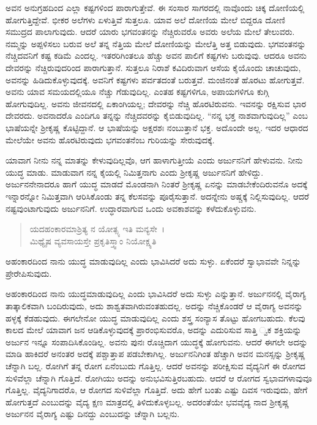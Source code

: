 ಅವನ ಅನುಗ್ರಹದಿಂದ ಎಲ್ಲಾ ಕಷ್ಟಗಳಿಂದ ಪಾರಾಗುತ್ತೇವೆ. ಈ ಸಂಸಾರ ಸಾಗರದಲ್ಲಿ ನಾವೊಂದು ಚಿಕ್ಕ ದೋಣಿಯಲ್ಲಿ ಹೋಗುತ್ತಿದ್ದೇವೆ. ಭೀಕರ ಅಲೆಗಳು ಏಳುತ್ತಿವೆ ಸುತ್ತಲೂ. ಯಾವ ಅಲೆ ದೋಣಿಯ ಮೇಲೆ ಬಿದ್ದರೂ ದೋಣಿ ಸಮುದ್ರದ ಪಾಲಾಗುವುದು. ಆದರೆ ಯಾರು ಭಗವಂತನನ್ನು ನೆಚ್ಚಿರುವರೊ ಅವರು ಅಲೆಯ ಮೇಲೆ ತೇಲುವರು. ನಮ್ಮನ್ನು ಅಪ್ಪಳಿಸಲು ಬರುವ ಅಲೆ ತನ್ನ ನೆತ್ತಿಯ ಮೇಲೆ ದೋಣಿಯನ್ನು ಮೇಲೆತ್ತಿ ಅತ್ತ ಬಿಡುವುದು. ಭಗವಂತನನ್ನು ನೆಚ್ಚಿದವನಿಗೆ ಕಷ್ಟ ಕಡಿಮೆ ಎಂದಲ್ಲ. ಇತರರಿಗಿಂತಲೂ ಹೆಚ್ಚು ಅವನ ಪಾಲಿಗೆ ಕಷ್ಟಗಳು ಬರುವುವು. ಆದರೂ ಅವನು ದೇವರನ್ನು ನೆಚ್ಚಿರುವುದರಿಂದ ಪಾರಾಗುತ್ತಾನೆ. ಸುತ್ತಲೂ ನಿರಾಶೆ ಕವಿದಿರುವಾಗ ಆಸೆಯ ಕೈಯೊಂದು ಚಾಚುವುದು, ಅವನನ್ನು ಹಿಡಿದುಕೊಳ್ಳುವುದಕ್ಕೆ. ಅವನಿಗೆ ಕಷ್ಟಗಳು ಪರ್ವತದಂತೆ ಬರುತ್ತವೆ. ಮಂಜಿನಂತೆ ಹೊರಟು ಹೋಗುತ್ತವೆ. ಅವನು ಯಾವ ಸಮಯದಲ್ಲಿಯೂ ನೆಚ್ಚು ಗೆಡುವುದಿಲ್ಲ. ಎಂತಹ ಕಷ್ಟಗಳಿಗೂ, ಅಪಾಯಗಳಿಗೂ ಕುಗ್ಗಿ ಹೋಗುವುದಿಲ್ಲ. ಅವನು ಜೀವನದಲ್ಲಿ ಏಕಾಂಗಿಯಲ್ಲ; ದೇವರನ್ನು ನೆಚ್ಚಿ ಹೊರಟಿರುವನು. ಇವನನ್ನು ರಕ್ಷಿಸುವ ಭಾರ ದೇವರದು. ಅವನಾದರೊ ಎಂದಿಗೂ ತನ್ನನ್ನು ನೆಚ್ಚಿದವರನ್ನು ಕೈಬಿಡುವುದಿಲ್ಲ. “ನನ್ನ ಭಕ್ತ ನಾಶವಾಗುವುದಿಲ್ಲ” ಎಂಬ ಭಾಷೆಯನ್ನೇ ಶ‍್ರೀಕೃಷ್ಣ ಕೊಟ್ಟಿದ್ದಾನೆ. ಆ ಭಾಷೆಯನ್ನು ಅಕ್ಷರಶಃ ನಂಬುತ್ತಾನೆ ಭಕ್ತ. ಅದೊಂದೇ ಅಲ್ಲ. ಇದರ ಆಧಾರದ ಮೇಲೆಯೇ ಅವನು ಹೊರಟಿರುವುದು ಭಗವಂತನೆಂಬ ಗುರಿಯನ್ನು ಸೇರುವುದಕ್ಕೆ.

ಯಾವಾಗ ನೀನು ನನ್ನ ಮಾತನ್ನು ಕೇಳುವುದಿಲ್ಲವೊ, ಆಗ ಹಾಳಾಗುತ್ತೀಯೆ ಎಂದು ಅರ್ಜುನನಿಗೆ ಹೇಳುವನು. ನೀನು ಯುದ್ಧ ಮಾಡು. ಮಾಡುವಾಗ ನನ್ನ ಕೈಯಲ್ಲಿ ನಿಮಿತ್ತನಾಗು ಎಂದು ಶ‍್ರೀಕೃಷ್ಣ ಅರ್ಜುನನಿಗೆ ಹೇಳಿದ್ದು. ಅರ್ಜುನನೇನಾದರೂ ಹಾಗೆ ಯುದ್ಧ ಮಾಡದೆ ಮೊಂಡನಾಗಿ ನಿಂತರೆ ಶ‍್ರೀಕೃಷ್ಣ ಏನನ್ನು ಮಾಡಬೇಕೆಂದಿರುವನೊ ಅದಕ್ಕೆ ಇನ್ನಾರನ್ನೋ ನಿಮಿತ್ತವಾಗಿ ಆರಿಸಿಕೊಂಡು ತನ್ನ ಕೆಲಸವನ್ನು ಪೂರೈಸುತ್ತಾನೆ. ಅದನ್ನೇನು ಅಷ್ಚಕ್ಕೆ ನಿಲ್ಲಿಸುವುದಿಲ್ಲ. ಆದರೆ ನಷ್ಟವುಂಟಾಗುವುದು ಅರ್ಜುನನಿಗೆ. ಉದ್ಧಾರವಾಗುವ ಒಂದು ಅವಕಾಶವನ್ನು ಕಳೆದುಕೊಳ್ಳುವನು.

\begin{verse}
ಯದಹಂಕಾರಮಾಶ್ರಿತ್ಯ ನ ಯೋತ್ಸ್ಯ ಇತಿ ಮನ್ಯಸೇ~।\\ಮಿಥ್ಯೈಷ ವ್ಯವಸಾಯಸ್ತೇ ಪ್ರಕೃತಿಸ್ತ್ವಾಂ ನಿಯೋಕ್ಷ್ಯತಿ 
\end{verse}

{\small ಅಹಂಕಾರದಿಂದ ನಾನು ಯುದ್ಧ ಮಾಡುವುದಿಲ್ಲ ಎಂದು ಭಾವಿಸಿದರೆ ಅದು ಸುಳ್ಳು. ಏಕೆಂದರೆ ಸ್ವಾಭಾವವೇ ನಿನ್ನನ್ನು ಪ್ರೇರೇಪಿಸುವುದು.}

ಅಹಂಕಾರದಿಂದ ನಾನು ಯುದ್ಧಮಾಡುವುದಿಲ್ಲ ಎಂದು ಭಾವಿಸಿದರೆ ಅದು ಸುಳ್ಳು ಎನ್ನುತ್ತಾನೆ. ಅರ್ಜುನನಲ್ಲಿ ವೈರಾಗ್ಯ ತಾತ್ಕಾಲಿಕವಾಗಿ ಬಂದಿರುವುದು, ಅದು ಶಾಶ್ವತವಾಗಿರುವಂತಹುದಲ್ಲ. ಅದನ್ನು ನೆಚ್ಚಿಕೊಂಡರೆ ಆ ವೈರಾಗ್ಯ ಅವನನ್ನು ಹಳ್ಳಕ್ಕೆ ಕೆಡಹುವುದು. ಈಗಲೇನೋ ಯುದ್ಧ ಮಾಡುವುದಿಲ್ಲ ಎಂದು ಶಸ್ತ್ರ ಸಂನ್ಯಾಸ ತೊಟ್ಟು ಹೋಗಬಹುದು. ಕೆಲವು ಕಾಲದ ಮೇಲೆ ಯಾವಾಗ ಜನ ಆಡಿಕೊಳ್ಳುವುದಕ್ಕೆ ಪ್ರಾರಂಭಿಸುವರೊ, ಅದನ್ನು ಎದುರಿಸುವ ಸಾತ್ತಿ ್ವಕ ಶಕ್ತಿಯನ್ನು ಅರ್ಜುನ ಇನ್ನೂ ಸಂಪಾದಿಸಿಕೊಂಡಿಲ್ಲ. ಅವನು ಪುನಃ ರೊಚ್ಚಿದಾಗ ಯುದ್ಧಕ್ಕೆ ಹೋಗುವನು. ಆದರೆ ಈಗಲೇ ಅದನ್ನು ಮಾಡಿ ಹಾಕಿದರೆ ಅನಂತರ ಅದಕ್ಕೆ ಪಶ್ಚಾತ್ತಾಪ ಪಡಬೇಕಾಗಿಲ್ಲ. ಅರ್ಜುನನಿಗಿಂತ ಹೆಚ್ಚಾಗಿ ಅವನ ಮನಸ್ಸನ್ನು ಶ‍್ರೀಕೃಷ್ಣ ಚೆನ್ನಾಗಿ ಬಲ್ಲ. ರೋಗಿಗೆ ತನ್ನ ರೋಗ ಏನೆಂಬುದು ಗೊತ್ತಿಲ್ಲ. ಆದರೆ ಅವನನ್ನು ಪರೀಕ್ಷಿಸುವ ವೈದ್ಯನಿಗೆ ಈ ರೋಗದ ಸುಳಿವೆಲ್ಲಾ ಚೆನ್ನಾಗಿ ಗೊತ್ತಿದೆ. ರೋಗಿಯು ಅದನ್ನು ಅನುಭವಿಸುತ್ತಿರಬಹುದು. ಆದರೆ ಆ ರೋಗದ ಸ್ವಭಾವಗಳಾವುವೂ ಗೊತ್ತಿಲ್ಲ. ವೈದ್ಯನಿಗಾದರೊ, ಆ ರೋಗದ ಸುಳಿವೆಲ್ಲಾ ಗೊತ್ತಿದೆ. ಅದು ಹೇಗೆ ಬಂತು ಎಷ್ಟು ದಿವಸ ಇರುವುದು, ಹೇಗೆ ಹೋಗುತ್ತದೆ ಎಂಬುದನ್ನು ವೈದ್ಯ ಕ್ಷಣ ಮಾತ್ರದಲ್ಲಿ ತಿಳಿದುಕೊಳ್ಳಬಲ್ಲ. ಅದರಂತೆಯೇ ಭವವೈದ್ಯ ನಾದ ಶ‍್ರೀಕೃಷ್ಣ ಅರ್ಜುನನ ವೈರಾಗ್ಯ ಎಷ್ಟು ದಿನದ್ದು ಎಂಬುದನ್ನು ಚೆನ್ನಾಗಿ ಬಲ್ಲನು.

